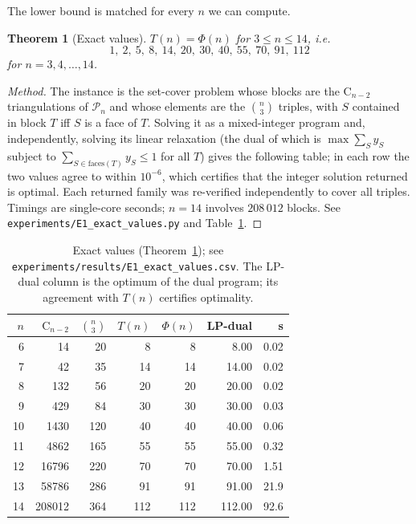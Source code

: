 \documentclass[11pt,a4paper]{article}
\newtheorem{theorem}{Theorem}[section]
\theoremstyle{definition}
\newcommand{\Pol}{\mathcal{P}}
\newcommand{\Cat}{\mathrm{C}}
\begin{document}
The lower bound is matched for every $n$ we can compute.

\begin{theorem}[Exact values]\label{thm:exact}
$T(n) = \Phi(n)$ for $3 \le n \le 14$, i.e.\
\[
1,\ 2,\ 5,\ 8,\ 14,\ 20,\ 30,\ 40,\ 55,\ 70,\ 91,\ 112
\]
for $n = 3, 4, \dots, 14$.
\end{theorem}

\begin{proof}[Method]
The instance is the set-cover problem whose blocks are the $\Cat_{n-2}$
triangulations of $\Pol_n$ and whose elements are the $\binom{n}{3}$ triples, with
$S$ contained in block $T$ iff $S$ is a face of $T$. Solving it as a
mixed-integer program and, independently, solving its linear relaxation
(the dual of which is $\max \sum_S y_S$ subject to $\sum_{S \in \mathrm{faces}(T)}
y_S \le 1$ for all $T$) gives the following table; in each row the two values
agree to within $10^{-6}$, which certifies that the integer solution returned is
optimal. Each returned family was re-verified independently to cover all
triples. Timings are single-core seconds; $n = 14$ involves $208\,012$ blocks.
See \texttt{experiments/E1\_exact\_values.py} and Table~\ref{tab:exact}.
\end{proof}

\begin{table}[h]
\centering
\begin{tabular}{rrrrrrr}
\toprule
$n$ & $\Cat_{n-2}$ & $\binom{n}{3}$ & $T(n)$ & $\Phi(n)$ & LP-dual & s \\
\midrule
 6 & 14 & 20 & 8 & 8 & 8.00 & 0.02\\
 7 & 42 & 35 & 14 & 14 & 14.00 & 0.02\\
 8 & 132 & 56 & 20 & 20 & 20.00 & 0.02\\
 9 & 429 & 84 & 30 & 30 & 30.00 & 0.03\\
10 & 1430 & 120 & 40 & 40 & 40.00 & 0.06\\
11 & 4862 & 165 & 55 & 55 & 55.00 & 0.32\\
12 & 16796 & 220 & 70 & 70 & 70.00 & 1.51\\
13 & 58786 & 286 & 91 & 91 & 91.00 & 21.9\\
14 & 208012 & 364 & 112 & 112 & 112.00 & 92.6\\
\bottomrule
\end{tabular}
\caption{Exact values (Theorem~\ref{thm:exact}); see
\texttt{experiments/results/E1\_exact\_values.csv}. The LP-dual column is the
optimum of the dual program; its agreement with $T(n)$ certifies optimality.}
\label{tab:exact}
\end{table}
\end{document}

